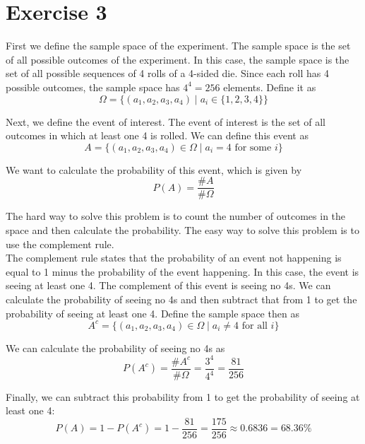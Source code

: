 \section{Exercise 3}

First we define the sample space of the experiment. The sample space is the set of all possible outcomes of the experiment. In this case, the sample space is the set of all possible sequences of 4 rolls of a 4-sided die. Since each roll has 4 possible outcomes, the sample space has $4^4 = 256$ elements. Define it as
\[
	\Omega = \{ (a_1, a_2, a_3, a_4) \mid a_i \in \{1, 2, 3, 4\} \}
\]

Next, we define the event of interest. The event of interest is the set of all outcomes in which at least one 4 is rolled. We can define this event as
\[
	A = \{ (a_1, a_2, a_3, a_4) \in \Omega \mid a_i = 4 \text{ for some } i \}
\]

We want to calculate the probability of this event, which is given by
\[
	P(A) = \frac{\# A}{\#\Omega}
\]

The hard way to solve this problem is to count the number of outcomes in the space and then calculate the probability. The easy way to solve this problem is to use the complement rule.\\[2ex]
The complement rule states that the probability of an event not happening is equal to 1 minus the probability of the event happening. In this case, the event is seeing at least one 4. The complement of this event is seeing no 4s. We can calculate the probability of seeing no 4s and then subtract that from 1 to get the probability of seeing at least one 4. Define the sample space then as
\[
	A^c = \{ (a_1, a_2, a_3, a_4) \in \Omega \mid a_i \neq 4 \text{ for all } i \}
\]

We can calculate the probability of seeing no 4s as
\[
	P(A^c) = \frac{\# A^c}{\#\Omega} = \frac{3^4}{4^4} = \frac{81}{256}
\]

Finally, we can subtract this probability from 1 to get the probability of seeing at least one 4:
\[
	P(A) = 1 - P(A^c) = 1 - \frac{81}{256} = \frac{175}{256} \approx 0.6836 = 68.36\%
\]
